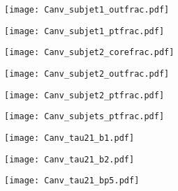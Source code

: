 \begin{figure}[H]
    \begin{center}
        \texttt{[image: Canv\_subjet1\_outfrac.pdf]}
        \caption{}
    \end{center}
\end{figure}
\begin{figure}[H]
    \begin{center}
        \texttt{[image: Canv\_subjet1\_ptfrac.pdf]}
        \caption{}
    \end{center}
\end{figure}
\begin{figure}[H]
    \begin{center}
        \texttt{[image: Canv\_subjet2\_corefrac.pdf]}
        \caption{}
    \end{center}
\end{figure}
\begin{figure}[H]
    \begin{center}
        \texttt{[image: Canv\_subjet2\_outfrac.pdf]}
        \caption{}
    \end{center}
\end{figure}
\begin{figure}[H]
    \begin{center}
        \texttt{[image: Canv\_subjet2\_ptfrac.pdf]}
        \caption{}
    \end{center}
\end{figure}
\begin{figure}[H]
    \begin{center}
        \texttt{[image: Canv\_subjets\_ptfrac.pdf]}
        \caption{}
    \end{center}
\end{figure}
\begin{figure}[H]
    \begin{center}
        \texttt{[image: Canv\_tau21\_b1.pdf]}
        \caption{}
    \end{center}
\end{figure}
\begin{figure}[H]
    \begin{center}
        \texttt{[image: Canv\_tau21\_b2.pdf]}
        \caption{}
    \end{center}
\end{figure}
\begin{figure}[H]
    \begin{center}
        \texttt{[image: Canv\_tau21\_bp5.pdf]}
        \caption{}
    \end{center}
\end{figure}
